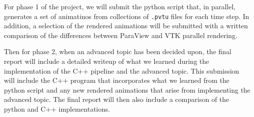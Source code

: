 For phase 1 of the project, we will submit the python script that, in parallel, generates a set of animatinos from collections of \texttt{.pvtu} files for each time step. In addition, a selection of the rendered animations will be submitted with a written comparison of the differences between ParaView and VTK parallel rendering.

Then for phase 2, when an advanced topic has been decided upon, the final report will include a detailed writeup of what we learned during the implementation of the C++ pipeline and the advanced topic. This submission will include the C++ program that incorporates what we learned from the python script and any new rendered animations that arise from implementing the advanced topic. The final report will then also include a comparison of the python and C++ implementations.